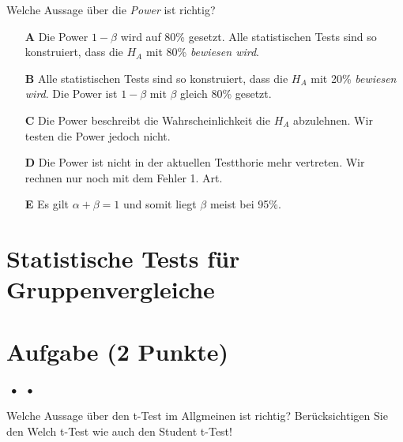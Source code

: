 \documentclass[a4paper, 9pt]{scrartcl}\usepackage[]{graphicx}\usepackage[]{xcolor}
\begin{document}
Welche Aussage über die \textit{Power} ist richtig?



\begin{enumerate}
\item [\textbf{A} \msquare] Die Power $1-\beta$ wird auf 80\% gesetzt. Alle statistischen Tests sind so konstruiert, dass die $H_A$ mit 80\% \textit{bewiesen wird}.
\item [\textbf{B} \msquare] Alle statistischen Tests sind so konstruiert, dass die $H_A$ mit 20\% \textit{bewiesen wird}. Die Power ist $1-\beta$ mit $\beta$ gleich 80\% gesetzt.
\item [\textbf{C} \msquare] Die Power beschreibt die Wahrscheinlichkeit die $H_A$ abzulehnen. Wir testen die Power jedoch nicht.
\item [\textbf{D} \msquare] Die Power ist nicht in der aktuellen Testthorie mehr vertreten. Wir rechnen nur noch mit dem Fehler 1. Art.
\item [\textbf{E} \msquare] Es gilt $\alpha + \beta = 1$ und somit liegt $\beta$ meist bei 95\%.
\end{enumerate}
\section*{Statistische Tests für Gruppenvergleiche} 

\section{Aufgabe \hfill (2 Punkte)}

\ifcollection
\begin{flushright}
\tiny\vspace{-2Ex}
\textbf{\examinhaltstart}
\exammodulemathstat $\;\bullet$
\exammodulestat $\;\bullet$
\exammodulestatbbv 
\vspace{-1Ex}
\end{flushright}
\fi




Welche Aussage über den t-Test im Allgmeinen ist richtig? Berücksichtigen Sie den Welch t-Test wie auch den Student t-Test!
\end{document}
